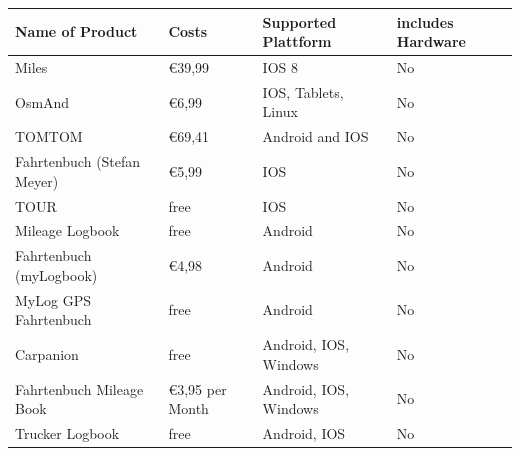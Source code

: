 \begin{tabular}{p{3cm}p{5cm}p{3cm}p{2cm}}
\toprule

  \textbf{Name of \newline Product} & \textbf{Costs} & \textbf{Supported Plattform} & \textbf{includes Hardware} \\
\midrule
  Miles                      & \euro 39,99                                                                                                 & IOS 8                 & No  \\ 
OsmAnd                     & \euro 6,99                                                                                                  & IOS, Tablets, Linux   & No  \\ 
TOMTOM                     & \euro 69,41                                                                                                 & Android and IOS       & No  \\ 
Fahrtenbuch (Stefan Meyer) & \euro 5,99                                                                                                  & IOS                   & No  \\ 
TOUR                       & free                                                                                                        & IOS                   & No  \\ 
Mileage Logbook            & free                                                                                                        & Android               & No  \\ 
Fahrtenbuch (myLogbook)    & \euro 4,98                                                                                                  & Android               & No  \\ 
MyLog GPS Fahrtenbuch      & free                                                                                                        & Android               & No  \\ 
Carpanion                  & free                                                                                                        & Android, IOS, Windows & No  \\ 
Fahrtenbuch Mileage Book   & \euro 3,95 per Month                                                                                        & Android, IOS, Windows & No  \\ 
Trucker Logbook            & free                                                                                                        & Android, IOS          & No  \\ 

\end{tabular}

